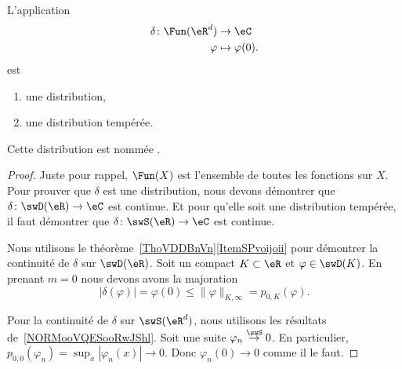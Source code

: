 \begin{lemmaDef}      \label{DEFooUSTNooYEZfPN}
    L'application
    \begin{equation}
        \begin{aligned}
            \delta\colon \Fun(\eR^d)&\to \eC \\
            \varphi&\mapsto \varphi(0).
        \end{aligned}
    \end{equation}
    est
    \begin{enumerate}
        \item
            une distribution,
        \item
            une distribution tempérée.
    \end{enumerate}
    Cette distribution est nommée .
\end{lemmaDef}

\begin{proof}
    Juste pour rappel, \( \Fun(X)\) est l'ensemble de toutes les fonctions sur \( X\). Pour prouver que \( \delta\) est une distribution, nous devons démontrer que \( \delta\colon \swD(\eR)\to \eC\) est continue. Et pour qu'elle soit une distribution tempérée, il faut démontrer que \( \delta\colon \swS(\eR)\to \eC\) est continue.

    Nous utilisons le théorème~\ref{ThoVDDBnVn}\ref{ItemSPvoijoii} pour démontrer la continuité de \( \delta\) sur \( \swD(\eR)\). Soit un compact \( K\subset \eR\) et \( \varphi\in \swD(K)\). En prenant \( m=0\) nous devons avons la majoration
    \begin{equation}
        | \delta(\varphi)|=\varphi(0) \leq \| \varphi \|_{K,\infty}=p_{0,K}(\varphi).
    \end{equation}

    Pour la continuité de \( \delta\) sur \( \swS(\eR^d)\), nous utilisons les résultats de~\ref{NORMooVQESooRwJShl}. Soit une suite \( \varphi_n\stackrel{\swS}{\to}0\). En particulier, \( p_{0,0}(\varphi_n)=\sup_x| \varphi_n(x) |\to 0\). Donc \( \varphi_n(0)\to 0\) comme il le faut.
\end{proof}

